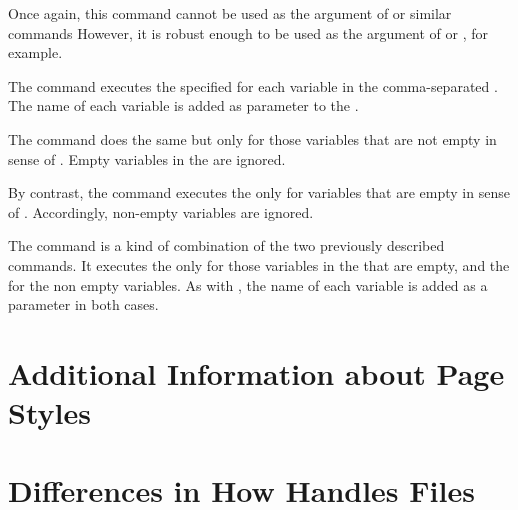 Once again, this command cannot be used as the argument
of  or similar commands However,
it is robust enough to be used as the argument of
 or , for
example.%
%
\EndIndexGroup


\begin{Declaration}
\end{Declaration}
The 
 command executes the specified  for each
variable in the comma-separated . The name of each
variable is added as parameter to the .%

The  command does the same but only for those
variables that are not empty in sense of
. Empty variables in the  are ignored.

By contrast, the  command executes the
 only for variables that are empty in sense of
. Accordingly, non-empty variables are
ignored.

The  command is a kind of combination of the two
previously described commands. It executes the  only for
those variables in the  that are empty, and the
 for the non empty variables. As with , the
name of each variable is added as a parameter in both cases.%
\EndIndexGroup
%
\EndIndexGroup


\section{Additional Information about Page Styles}
\BeginIndexGroup
{}

%
\EndIndexGroup

\iffalse%
\section{Differences in How  Handles  Files}
\BeginIndexGroup
{}


